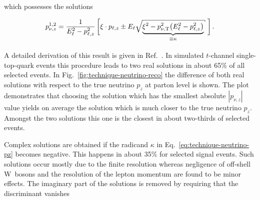 which possesses the solutions

\begin{align}
p_{\nu,z}^{1,2}=\frac{1}{E_{\ell}^{2}-p_{\ell,z}^{2}}\left[\xi\cdot p_{\ell,z}\pm E_{\ell} \sqrt{\vphantom{\big(}\smash{\underbrace{\xi^2-p_{\nu,\mathrm{T}}^2\big(E_{\ell}^2-p_{\ell,z}^2\big)}_{\equiv \kappa}}}~\right].\vphantom{\underbrace{\Big|}_{x}} \label{eq:technique-neutrino-pz}
\end{align}

A detailed derivation of this result is given in Ref.~\cite{Chwalek:1416031}. In simulated $t$-channel single-top-quark events this procedure leads to two real solutions in about 65\% of all selected events. In Fig.~\ref{fig:technique-neutrino-reco} the difference of both real solutions with respect to the true neutrino $p_{z}$ at parton level is shown. The plot demonstrates that choosing the solution which has the smallest absolute $|p_{\nu,z}|$ value yields on average the solution which is much closer to the true neutrino $p_{z}$. Amongst the two solutions this one is the closest in about two-thirds of selected events.


Complex solutions are obtained if the radicand $\kappa$ in Eq.~\ref{eq:technique-neutrino-pz} becomes negative. This happens in about 35\% for selected signal events. Such solutions occur mostly due to the finite \met resolution whereas negligence of off-shell W~bosons and the resolution of the lepton momentum are found to be minor effects. The imaginary part of the solutions is removed by requiring that the discriminant vanishes

